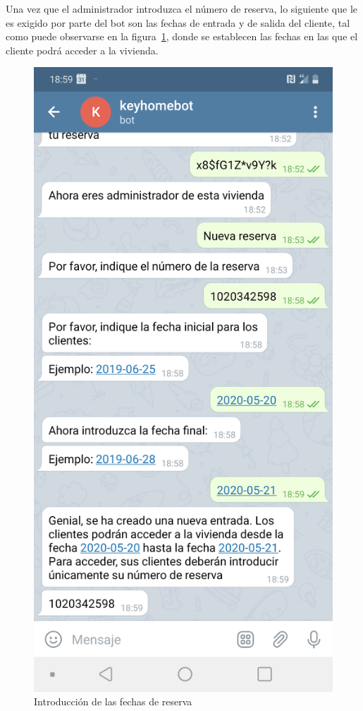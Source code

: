 Una vez que el administrador introduzca el número de reserva, lo siguiente que le es exigido por parte del bot son las fechas de entrada y de salida del cliente, tal como puede observarse en la figura~\ref{fig:introduccion-de-las-fechas-de-reserva}, donde se establecen las fechas en las que el cliente podrá acceder a la vivienda.

\begin{figure}[tbp]
\centering
\includegraphics[scale = 0.15]{fig/Fechas-de-reserva.png}
\caption{Introducción de las fechas de reserva}
\label{fig:introduccion-de-las-fechas-de-reserva}
\end{figure}

